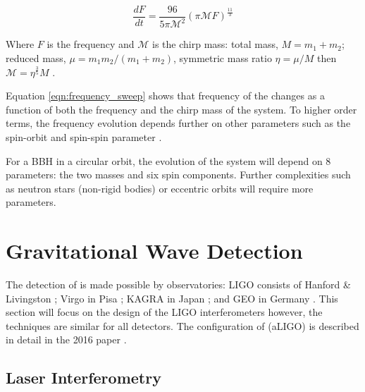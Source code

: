 \begin{equation}
   \frac{dF}{dt} = \frac{96}{5 \pi \mathcal{M}^2} (\pi \mathcal{M} F)^{\frac{11}{3}}
   \label{eqn:frequency_sweep}
\end{equation}

Where $F$ is the \gw frequency and $\mathcal{M}$ is the chirp mass: total mass, $M = m_1 + m_2$; reduced mass, $\mu = m_1 m_2/(m_1+m_2)$, symmetric mass ratio $\eta = \mu/M$ then $\mathcal{M} = \eta^\frac{3}{5} M$ \cite{PE:1995}.

Equation \ref{eqn:frequency_sweep} shows that frequency of the \gw changes as a function of both the frequency and the chirp mass of the system. To higher order terms, the frequency evolution depends further on other parameters such as the spin-orbit and spin-spin parameter \cite{CBC_spin:1993}.

For a BBH in a circular orbit, the evolution of the system will depend on 8 parameters: the two masses and six spin components. Further complexities such as neutron stars (non-rigid bodies) or eccentric orbits will require more parameters.

\section{\label{sec:IFOs}Gravitational Wave Detection}


The detection of \gws is made possible by \gw observatories: LIGO consists of Hanford \& Livingston \cite{aLIGO:2015}; Virgo in Pisa \cite{aVirgo:2015}; KAGRA in Japan \cite{KAGRA:2021}; and GEO in Germany \cite{GEO600:2002}. This section will focus on
the design of the LIGO interferometers however, the techniques are similar for all detectors. The configuration of \aligo (aLIGO) is described in detail in the 2016 paper \cite{aLIGO:2015}.

\subsection{\label{sec:laser_interferometry}Laser Interferometry}

